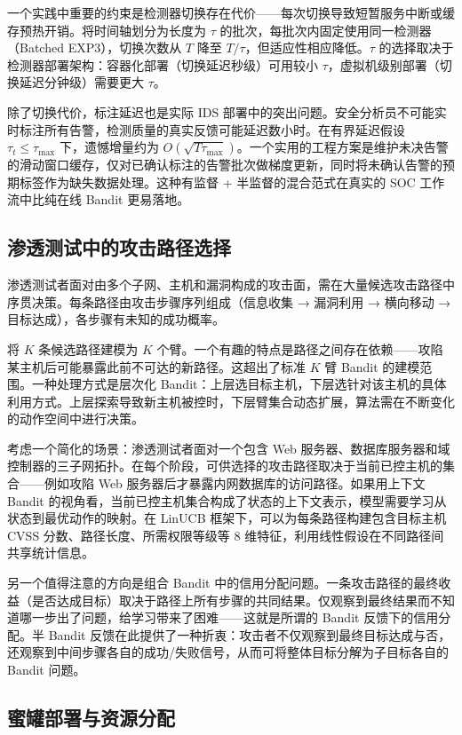 \documentclass[UTF8,a4paper,11pt,zihao=5]{ctexart}
\begin{document}
一个实践中重要的约束是检测器切换存在代价——每次切换导致短暂服务中断或缓存预热开销。将时间轴划分为长度为 $\tau$ 的批次，每批次内固定使用同一检测器（Batched EXP3），切换次数从 $T$ 降至 $T/\tau$，但适应性相应降低。$\tau$ 的选择取决于检测器部署架构：容器化部署（切换延迟秒级）可用较小 $\tau$，虚拟机级别部署（切换延迟分钟级）需要更大 $\tau$。

除了切换代价，标注延迟也是实际 IDS 部署中的突出问题。安全分析员不可能实时标注所有告警，检测质量的真实反馈可能延迟数小时。在有界延迟假设 $\tau_t \le \tau_{\max}$ 下，遗憾增量约为 $O(\sqrt{T\tau_{\max}})$。一个实用的工程方案是维护未决告警的滑动窗口缓存，仅对已确认标注的告警批次做梯度更新，同时将未确认告警的预期标签作为缺失数据处理。这种有监督 + 半监督的混合范式在真实的 SOC 工作流中比纯在线 Bandit 更易落地。

\subsection{渗透测试中的攻击路径选择}

渗透测试者面对由多个子网、主机和漏洞构成的攻击面，需在大量候选攻击路径中序贯决策。每条路径由攻击步骤序列组成（信息收集 → 漏洞利用 → 横向移动 → 目标达成），各步骤有未知的成功概率。

将 $K$ 条候选路径建模为 $K$ 个臂。一个有趣的特点是路径之间存在依赖——攻陷某主机后可能暴露此前不可达的新路径。这超出了标准 $K$ 臂 Bandit 的建模范围。一种处理方式是层次化 Bandit：上层选目标主机，下层选针对该主机的具体利用方式。上层探索导致新主机被控时，下层臂集合动态扩展，算法需在不断变化的动作空间中进行决策。

考虑一个简化的场景：渗透测试者面对一个包含 Web 服务器、数据库服务器和域控制器的三子网拓扑。在每个阶段，可供选择的攻击路径取决于当前已控主机的集合——例如攻陷 Web 服务器后才暴露内网数据库的访问路径。如果用上下文 Bandit 的视角看，当前已控主机集合构成了状态的上下文表示，模型需要学习从状态到最优动作的映射。在 LinUCB 框架下，可以为每条路径构建包含目标主机 CVSS 分数、路径长度、所需权限等级等 8 维特征，利用线性假设在不同路径间共享统计信息。

另一个值得注意的方向是组合 Bandit 中的信用分配问题。一条攻击路径的最终收益（是否达成目标）取决于路径上所有步骤的共同结果。仅观察到最终结果而不知道哪一步出了问题，给学习带来了困难——这就是所谓的 Bandit 反馈下的信用分配。半 Bandit 反馈在此提供了一种折衷：攻击者不仅观察到最终目标达成与否，还观察到中间步骤各自的成功/失败信号，从而可将整体目标分解为子目标各自的 Bandit 问题。

\subsection{蜜罐部署与资源分配}
\end{document}
